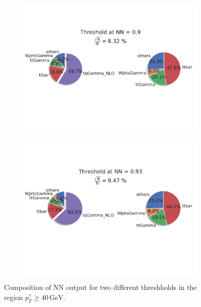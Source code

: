 \begin{figure}
    \centering
    \begin{subfigure}[b]{0.6\textwidth}
       \includegraphics[width=1\linewidth]{Plots/composition9phA40.pdf}
    \end{subfigure}
    
    \begin{subfigure}[b]{0.6\textwidth}
       \includegraphics[width=1\linewidth]{Plots/compositionTenphA40.pdf}
    \end{subfigure}
    \caption{Composition of NN output for two different threshholds in the region $p_T^\gamma \geq 40\,\si{\giga\electronvolt}$. }
    \label{fig:phptA40}
\end{figure}



